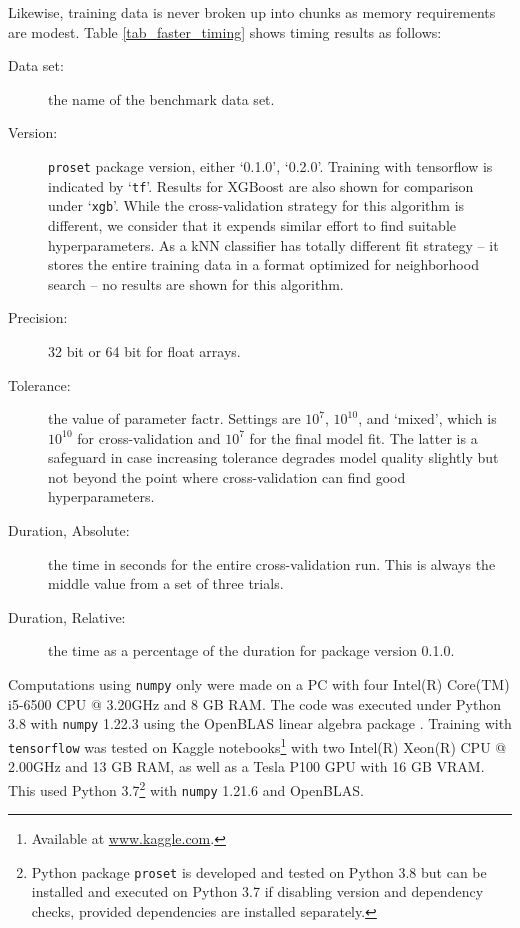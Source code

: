 Likewise, training data is never broken up into chunks as memory requirements are modest.
Table \ref{tab_faster_timing} shows timing results as follows:
%
\begin{description}
\item[Data set:] the name of the benchmark data set.
%
\item[Version:] \texttt{proset} package version, either `0.1.0', `0.2.0'.
Training with tensorflow is indicated by `\texttt{tf}'.
Results for XGBoost are also shown for comparison under `\texttt{xgb}'.
While the cross-validation strategy for this algorithm is different, we consider that it expends similar effort to find suitable hyperparameters.
As a kNN classifier has totally different fit strategy -- it stores the entire training data in a format optimized for neighborhood search -- no results are shown for this algorithm.
%
\item[Precision:] 32 bit or 64 bit for float arrays.
%
\item[Tolerance:] the value of parameter $\text{factr}$.
Settings are $10^{7}$, $10^{10}$, and `mixed', which is $10^{10}$ for cross-validation and $10^{7}$ for the final model fit.
The latter is a safeguard in case increasing tolerance degrades model quality slightly but not beyond the point where cross-validation can find good hyperparameters.
%
\item[Duration, Absolute:] the time in seconds for the entire cross-validation run.
This is always the middle value from a set of three trials.
%
\item[Duration, Relative:] the time as a percentage of the duration for package version 0.1.0.
\end{description}
%
Computations using \texttt{numpy} only were made on a PC with four Intel(R) Core(TM) i5-6500 CPU @ 3.20GHz and 8 GB RAM.
The code was executed under Python 3.8 with \texttt{numpy} 1.22.3 using the OpenBLAS linear algebra package \cite{Wang_13}.
Training with \texttt{tensorflow} was tested on Kaggle notebooks\footnote{Available at \url{www.kaggle.com}.} with two Intel(R) Xeon(R) CPU @ 2.00GHz and 13 GB RAM, as well as a Tesla P100 GPU with 16 GB VRAM.
This used Python 3.7\footnote{Python package \texttt{proset} is developed and tested on Python 3.8 but can be installed and executed on Python 3.7 if disabling version and dependency checks, provided dependencies are installed separately.} with \texttt{numpy} 1.21.6 and OpenBLAS.\par
%
